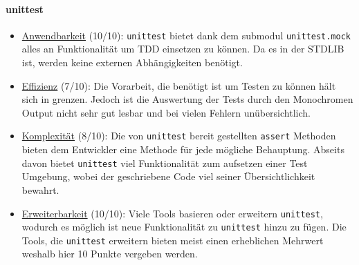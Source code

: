 \paragraph{unittest}\label{zusammenfassung:unit:unittest}\mbox{}
\newline
\begin{itemize}
    \item \underline{Anwendbarkeit} (10/10):\newline
    \lstinline{unittest} bietet dank dem submodul \lstinline{unittest.mock}
    alles an Funktionalität um TDD einsetzen zu können. Da es in der STDLIB ist,
    werden keine externen Abhängigkeiten benötigt.
    
    \item \underline{Effizienz} (7/10):\newline
    Die Vorarbeit, die benötigt ist um Testen zu können hält sich in grenzen.
    Jedoch ist die Auswertung der Tests durch den Monochromen Output nicht
    sehr gut lesbar und bei vielen Fehlern unübersichtlich.
    
    \item \underline{Komplexität} (8/10):\newline
    Die von \lstinline{unittest} bereit gestellten \lstinline{assert} Methoden
    bieten dem Entwickler eine Methode für jede mögliche Behauptung. Abseits
    davon bietet \lstinline{unittest} viel Funktionalität zum aufsetzen einer
    Test Umgebung, wobei der geschriebene Code viel seiner Übersichtlichkeit
    bewahrt.
    
    \item \underline{Erweiterbarkeit} (10/10):\newline
    Viele Tools basieren oder erweitern \lstinline{unittest}, wodurch es möglich
    ist neue Funktionalität zu \lstinline{unittest} hinzu zu fügen. Die Tools,
    die \lstinline{unittest} erweitern bieten meist einen erheblichen Mehrwert
    weshalb hier 10 Punkte vergeben werden.
\end{itemize}

